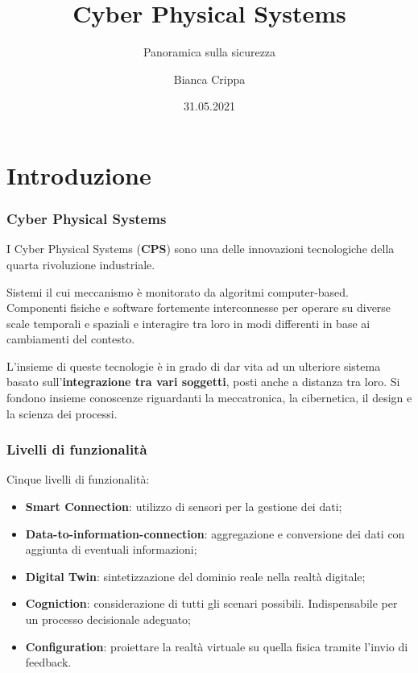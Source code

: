\documentclass{beamer}
\title{Cyber Physical Systems}
\subtitle{Panoramica sulla sicurezza}
\author{Bianca Crippa}
\institute{Università degli Studi di Bergamo
    \\ \url{https://github.com/Biancolinaa/CPS-presentation.git}
}
\date{31.05.2021}
\begin{document}
\frame{\titlepage}


\section{Introduzione}

\begin{frame}
    \frametitle{Cyber Physical Systems}
    I Cyber Physical Systems (\textbf{CPS}) sono una delle innovazioni tecnologiche della quarta rivoluzione industriale.
    
    Sistemi il cui meccanismo è monitorato da algoritmi computer-based. 
    Componenti fisiche e software fortemente interconnesse per operare su diverse scale temporali e spaziali e  
    interagire tra loro in modi differenti in base ai cambiamenti del contesto. 

    L'insieme di queste tecnologie è in grado di dar vita ad un ulteriore sistema basato sull'\textbf{integrazione tra vari soggetti}, posti anche a 
    distanza tra loro.    
    Si fondono insieme conoscenze riguardanti la meccatronica, la cibernetica, il design e la scienza dei processi.
    
\end{frame}

\begin{frame}
\frametitle{Livelli di funzionalità}

    Cinque livelli di funzionalità:
    \begin{itemize}
        \item \textbf{Smart Connection}: utilizzo di sensori per la gestione dei dati;
        \item \textbf{Data-to-information-connection}: aggregazione e conversione dei dati con aggiunta di eventuali informazioni;
        \item \textbf{Digital Twin}: sintetizzazione del dominio reale nella realtà digitale;
        \item \textbf{Cogniction}: considerazione di tutti gli scenari possibili. Indispensabile per un processo decisionale adeguato;
        \item \textbf{Configuration}: proiettare la realtà virtuale su quella fisica tramite l'invio di feedback.
    \end{itemize}
    
\end{frame}
\end{document}
